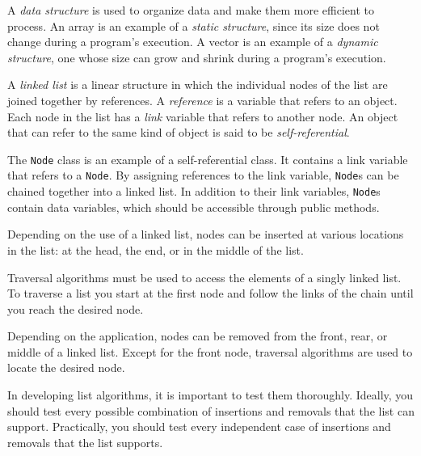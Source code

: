 \label{summaryof-important-points}

\begin{SMBL}
\item  A {\it data structure} is used to organize
data and make them more efficient to process.  An array is
an example of a {\it static structure}, since its size
does not change during a program's execution.  A vector
is an example of a {\it dynamic structure}, one whose
size can grow and shrink during a program's execution.

\item  A {\it linked list} is a linear structure in which
the individual nodes of the list are joined together by references.  A
{\it reference} is a variable that refers to an object.  Each node in
the list has a {\it link} variable that refers to another node.  An
object that can refer to the same kind of object is said to be {\it
self-referential}.

\item  The {\tt Node} class is an example of a self-referential class.
It contains a link variable that refers to a {\tt Node}. By assigning
references to the link variable, {\tt Node}s can be chained together
into a linked list.  In addition to their link variables, {\tt Node}s
contain data variables, which should be accessible through public
methods.

\item  Depending on the use of a linked list, nodes can be
inserted at various locations in the list: at the head,
the end, or in the middle of the list.

\item  Traversal algorithms must be used to access the elements
of a singly linked list.  To traverse a list you start at the
first node and follow the links of the chain until you
reach the desired node.

\item  Depending on the application, nodes can be
removed from the front, rear, or middle of a linked list.
Except for the front node, traversal algorithms are used to locate the
desired node.

\item  In developing list algorithms, it is important to test
them thoroughly.  Ideally, you should test every possible combination
of insertions and removals that the list can support.  Practically, you
should test every independent case of insertions and removals that the
list supports.


\end{SMBL}
